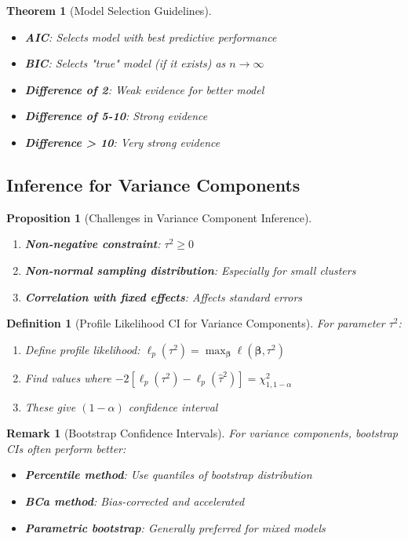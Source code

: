 \documentclass{article}
\newtheorem{definition}{Definition}
\newtheorem{theorem}{Theorem}
\newtheorem{proposition}{Proposition}
\newtheorem{remark}{Remark}
\begin{document}
\begin{theorem}[Model Selection Guidelines]
\begin{itemize}
    \item \textbf{AIC}: Selects model with best predictive performance
    \item \textbf{BIC}: Selects "true" model (if it exists) as $n \to \infty$
    \item \textbf{Difference of 2}: Weak evidence for better model
    \item \textbf{Difference of 5-10}: Strong evidence
    \item \textbf{Difference > 10}: Very strong evidence
\end{itemize}
\end{theorem}

\subsection{Inference for Variance Components}

\begin{proposition}[Challenges in Variance Component Inference]
\begin{enumerate}
    \item \textbf{Non-negative constraint}: $\tau^2 \geq 0$
    \item \textbf{Non-normal sampling distribution}: Especially for small clusters
    \item \textbf{Correlation with fixed effects}: Affects standard errors
\end{enumerate}
\end{proposition}

\begin{definition}[Profile Likelihood CI for Variance Components]
For parameter $\tau^2$:
\begin{enumerate}
    \item Define profile likelihood: $\ell_p(\tau^2) = \max_{\boldsymbol{\beta}} \ell(\boldsymbol{\beta}, \tau^2)$
    \item Find values where $-2[\ell_p(\tau^2) - \ell_p(\hat{\tau}^2)] = \chi^2_{1,1-\alpha}$
    \item These give $(1-\alpha)$ confidence interval
\end{enumerate}
\end{definition}

\begin{remark}[Bootstrap Confidence Intervals]
For variance components, bootstrap CIs often perform better:
\begin{itemize}
    \item \textbf{Percentile method}: Use quantiles of bootstrap distribution
    \item \textbf{BCa method}: Bias-corrected and accelerated
    \item \textbf{Parametric bootstrap}: Generally preferred for mixed models
\end{itemize}
\end{remark}
\end{document}
